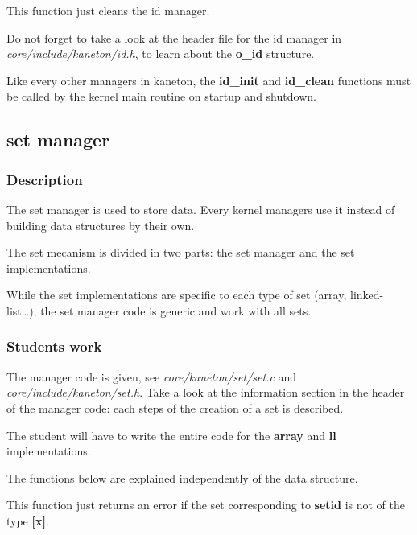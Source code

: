This function just cleans the id manager.

Do not forget to take a look  at the header file for the id manager in
\textit{core/include/kaneton/id.h}, to  learn about the \textbf{o\_id}
structure.

Like  every  other  managers  in kaneton,  the  \textbf{id\_init}  and
\textbf{id\_clean}  functions  must  be  called  by  the  kernel  main
routine on startup and shutdown.

%
%

\subsection{set manager}

\subsubsection{Description}

The set  manager is used to  store data. Every kernel  managers use it
instead of building data structures by their own.

The set mecanism is divided in  two parts: the set manager and the set
implementations.

While the set implementations are specific to each type of set (array,
linked-list\ldots), the set manager code  is generic and work with all
sets.

\subsubsection{Students work}

The  manager code  is given,  see  \textit{core/kaneton/set/set.c} and
\textit{core/include/kaneton/set.h}.  Take a  look at  the information
section in the header of the  manager code: each steps of the creation
of a set is described.

The student will have to  write the entire code for the \textbf{array}
and \textbf{ll} implementations.

The functions below are explained independently of the data structure.


This function just returns an error if the set corresponding to
\textbf{setid} is not of the type \textbf{[x]}.


